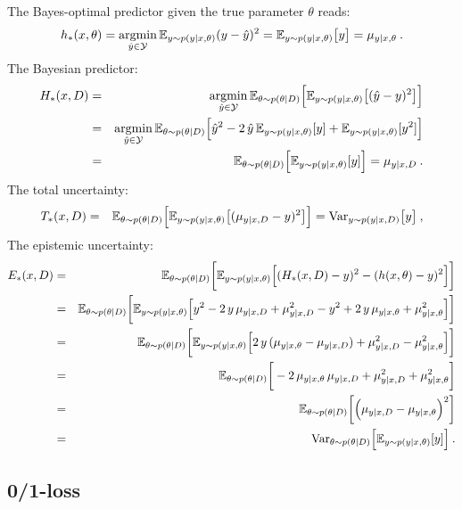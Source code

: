 The Bayes-optimal predictor given the true parameter $\theta$ reads:
\[ h_*(x,\theta) = 
  \mathop{\rm argmin}_{\hat{y}\in{\cal Y}}{\mathbb{E}}_{y\sim p(y\mid x,\theta)} (y-\hat{y})^2 = {\mathbb{E}}_{y\sim p(y|x,\theta)}\big[ y\big ] = \mu_{y|x,\theta}\:.      
\]
The Bayesian predictor:
\begin{eqnarray*}
   H_*(x,D) &= &
\mathop{\rm argmin}_{\hat{y}\in{\cal Y}} {\mathbb{E}}_{\theta\sim p(\theta|D)} \Big [{\mathbb{E}}_{y\sim p(y|x,\theta)}\big[ (\hat{y}-y)^2 \big ]\Big ]    \\
   &=& \mathop{\rm argmin}_{\hat{y}\in{\cal Y}} {\mathbb{E}}_{\theta\sim p(\theta|D)} \Big [
   \hat{y}^2-2\,\hat{y}\,{\mathbb{E}}_{y\sim p(y|x,\theta)}[y] + 
   {\mathbb{E}}_{y\sim p(y|x,\theta)}[y^2] \Big ]
   \\
  &= &{\mathbb{E}}_{\theta\sim p(\theta|D)}\Big[{\mathbb{E}}_{y\sim p(y|x,\theta)}[y] \Big ] =  \mu_{y|x,D}\:.
\end{eqnarray*}
%
The total uncertainty:
\begin{eqnarray*}
   T_*(x,D) &= &{\mathbb{E}}_{\theta\sim p(\theta|D)} \Big [{\mathbb{E}}_{y\sim p(y|x,\theta)}\big[ (\mu_{y|x,D}-y)^2 \big ]\Big ] = {\rm Var}_{y\sim p(y|x,D)}\big [ y\big ]\:,
\end{eqnarray*}
%
The epistemic uncertainty:
\begin{eqnarray*}
   E_*(x,D) &= &{\mathbb{E}}_{\theta\sim p(\theta|D)} \bigg [{\mathbb{E}}_{y\sim p(y|x,\theta)}\Big[ (H_*(x,D)-y)^2-(h(x,\theta)-y)^2 \Big ]\bigg ]\\
   &= &{\mathbb{E}}_{\theta\sim p(\theta|D)} \bigg [{\mathbb{E}}_{y\sim p(y|x,\theta)}\Big[ y^2-2\,y\,\mu_{y|x,D} + \mu_{y|x,D}^2-y^2+
   2\,y\,\mu_{y|x,\theta}+  \mu_{y|x,\theta}^2 \Big ]\bigg ]\\   
   &= &{\mathbb{E}}_{\theta\sim p(\theta|D)} \bigg [{\mathbb{E}}_{y\sim p(y|x,\theta)}\Big[ 2\,y\,(\mu_{y|x,\theta} - \mu_{y|x,D})+
   \mu_{y|x,D}^2-  \mu_{y|x,\theta}^2 \Big ]\bigg ]\\   
   &= &{\mathbb{E}}_{\theta\sim p(\theta|D)} \bigg [ -2\,\mu_{y|x,\theta}\,\mu_{y|x,D} + \mu_{y|x,D}^2+
   \mu_{y|x,\theta}^2\bigg ]\\   
   &= &{\mathbb{E}}_{\theta\sim p(\theta|D)} \bigg [ \Big(\mu_{y|x,D}-\mu_{y|x,\theta}\Big)^2 \bigg ]\\   
   &=& 
   {\rm Var}_{\theta\sim p(\theta|D)} \Big [ {\mathbb{E}}_{y\sim p(y|x,\theta)}[y] \Big ] \:.   
\end{eqnarray*}

\subsection{0/1-loss}

